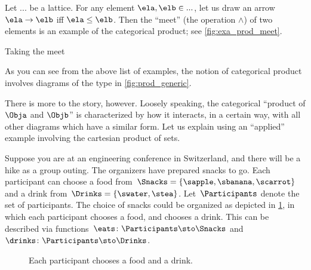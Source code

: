 \begin{example}\label{exa:meet-as-prod}
Let $...$ be a lattice. For any element $\ela, \elb \in ...$, let us draw an arrow $\ela \to \elb$ iff $\ela \leq \elb$. Then the ``meet'' (the operation $\wedge$) of two elements is an example of the categorical product; see \cref{fig:exa_prod_meet}.
  \begin{marginfigure}
  \begin{center}
  \end{center}
    \caption{Taking the meet}
    \label{fig:exa_prod_meet}
  \end{marginfigure}
\end{example}

As you can see from the above list of examples, the notion of categorical product involves diagrams of the type in \cref{fig:prod_generic}.

  \begin{marginfigure}
  \begin{center}
  \end{center}
  \caption{}
    \label{fig:prod_generic}
  \end{marginfigure}
There is more to the story, however. Loosely speaking, the categorical ``product of $\Obja$ and $\Objb$'' is characterized by how it interacts, in a certain way, with all other diagrams which have a similar form. Let us explain using an ``applied'' example involving the cartesian product of sets.

Suppose you are at an engineering conference in Switzerland, and there will be a hike as a group outing.
The organizers have prepared snacks to go.
Each participant can choose a food from~$\Snacks=\{\sapple,\sbanana,\scarrot\}$ and a drink from~$\Drinks=\{\swater,\stea\}$.
Let~$\Participants$ denote the set of participants. 
The choice of snacks could be organized as depicted in \cref{fig:snacks_1}, in which each participant chooses a food, and chooses a drink.
This can be described via functions~$\eats \colon \Participants \sto \Snacks$ and~$\drinks \colon  \Participants \sto \Drinks$.

\begin{figure}[h!]
  \begin{center}
  \end{center}
  \caption{Each participant chooses a food and a drink.}
  \label{fig:snacks_1}
\end{figure}

